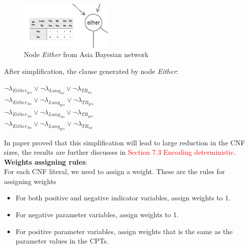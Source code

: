         \begin{figure}[h]
            \centering
            \includegraphics[width=0.4\textwidth]{pic/either01s.png}
            \caption{Node \textit{Either} from Asia Bayesian network}
            \label{fig:either01}
        \end{figure}
        
        After simplification, the clause generated by node \textit{Either}:\\
        \begin{center}
            $\neg \lambda_{Either_{yes}} \vee \neg \lambda_{Lung_{no}} \vee \neg  \lambda_{TB_{no}} $\\
            $\neg \lambda_{Either_{No}} \vee \neg \lambda_{Lung_{yes}} \vee \neg \lambda_{TB_{yes}}$\\
            $\neg \lambda_{Either_{No}} \vee \neg \lambda_{Lung_{No}} \vee \neg  \lambda_{TB_{yes}}$\\
            $\neg  \lambda_{Either_{No}} \vee \neg  \lambda_{Lung_{yes}} \vee \neg  \lambda_{TB_{no}}$
        \end{center}
        
        In paper \cite{enc2} proved that this simplification will lead to large reduction in the CNF sizes, the results are further discusses in \textcolor{red}{Section 7.3 Encoding deterministic}.\\
        
        \textbf{Weights assigning rules}:\\
        \noindent For each CNF literal, we need to assign a weight. These are the rules for assigning weights
        \begin{itemize}
            \item For both positive and negative indicator variables, assign weights to 1.
            \item For negative parameter variables, assign weights to 1.
            \item For positive parameter variables, assign weights that is the same as the parameter values in the CPTs.
        \end{itemize}
       
